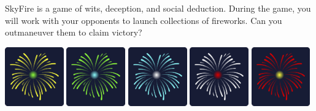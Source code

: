 \documentclass[a5paper, DIV=18, 12pt]{scrartcl}
\begin{document}
\vspace{-0.75ex}
\flushleft
SkyFire is a game of wits, deception, and social deduction. During the game, you will work with your opponents to launch collections of fireworks.  Can you outmaneuver them to claim victory? %

\vspace{2ex}

\includegraphics[width=0.19\textwidth]{Images/fireworks_card_front_display3.png} \hfill
\includegraphics[width=0.19\textwidth]{Images/fireworks_card_front_display4.png} \hfill
\includegraphics[width=0.19\textwidth]{Images/fireworks_card_front_display5.png} \hfill
\includegraphics[width=0.19\textwidth]{Images/fireworks_card_front_display6.png} \hfill
\includegraphics[width=0.19\textwidth]{Images/fireworks_card_front_display2.png}

\vspace{-0.0ex}
\end{document}

